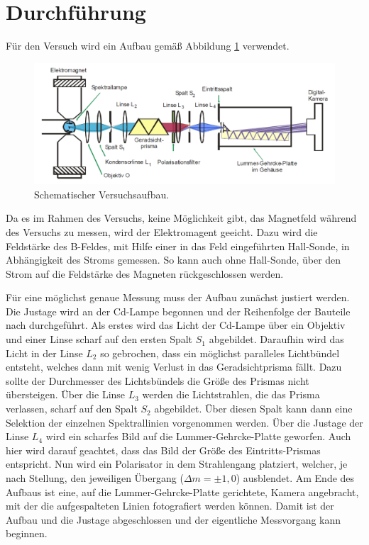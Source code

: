 \section{Durchführung}
\label{sec:Durchführung}


Für den Versuch wird ein Aufbau gemäß Abbildung \ref{fig:aufbau} verwendet.

\begin{figure}
    \centering
    \includegraphics[width=\textwidth]{Bilder/Aufbau.PNG}
    \caption{Schematischer Versuchsaufbau.}
    \label{fig:aufbau}
\end{figure}

Da es im Rahmen des Versuchs, keine Möglichkeit gibt, das Magnetfeld während des Versuchs zu messen, wird der Elektromagent geeicht. Dazu wird die Feldstärke des B-Feldes, mit Hilfe einer in das Feld eingeführten Hall-Sonde, in Abhängigkeit des Stroms gemessen. So kann auch ohne Hall-Sonde, über den Strom auf die Feldstärke des Magneten rückgeschlossen werden.



Für eine möglichst genaue Messung muss der Aufbau zunächst justiert werden. Die Justage wird an der Cd-Lampe begonnen und der Reihenfolge der Bauteile nach durchgeführt. 
Als erstes wird das Licht der Cd-Lampe über ein Objektiv und einer Linse scharf auf den ersten Spalt $S_1$ abgebildet.
Daraufhin wird das Licht in der Linse $L_2$ so gebrochen, dass ein möglichst paralleles Lichtbündel entsteht, welches dann mit wenig Verlust in das Geradsichtprisma fällt. Dazu sollte der Durchmesser des Lichtsbündels die Größe des Prismas nicht übersteigen. 
Über die Linse $L_3$ werden die Lichtstrahlen, die das Prisma verlassen, scharf auf den Spalt $S_2$ abgebildet. Über diesen Spalt kann dann eine Selektion der einzelnen Spektrallinien vorgenommen werden. Über die Justage der Linse $L_4$ wird ein scharfes Bild auf die Lummer-Gehrcke-Platte geworfen. Auch hier wird darauf geachtet, dass das Bild der Größe des Eintritts-Prismas entspricht. 
Nun wird ein Polarisator in dem Strahlengang platziert, welcher, je nach Stellung, den jeweiligen Übergang ($\Delta m = \pm1,0$) ausblendet.
Am Ende des Aufbaus ist eine, auf die Lummer-Gehrcke-Platte gerichtete, Kamera angebracht, mit der die aufgespalteten Linien fotografiert werden können. Damit ist der Aufbau und die Justage abgeschlossen und der eigentliche Messvorgang kann beginnen. 


